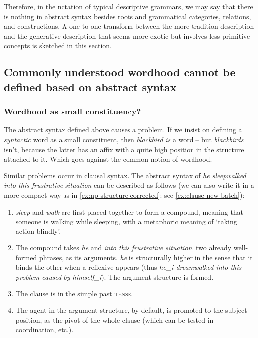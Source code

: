 \documentclass[a4paper, oneside, scheme=plain, 12pt]{article}
\newcommand{\form}[1]{\emph{#1}}
\newcommand{\translate}[1]{`#1'}
\newcommand*{\category}[1]{\textsc{#1}}
\begin{document}
Therefore, in the notation of typical descriptive grammars,
we may say that there is nothing in abstract syntax besides roots
and grammatical categories, relations, and constructions.
A one-to-one transform between the more tradition description
and the generative description that seems more exotic but involves less primitive concepts
is sketched in this section.

\subsection{Commonly understood wordhood cannot be defined based on abstract syntax}\label{sec:no-word-in-syntax}



\subsubsection{Wordhood as small constituency?}\label{sec:derivation-deep-tree}

The abstract syntax defined above causes a problem.
If we insist on defining a \emph{syntactic} word as a small constituent,
then \form{blackbird} \emph{is} a word -- but \form{blackbirds} isn't,
because the latter has an affix with a quite high position in the structure attached to it.
Which goes against the common notion of wordhood.

Similar problems occur in clausal syntax.
The abstract syntax of \form{he sleepwalked into this frustrative situation}
can be described as follows
(we can also write it in a more compact way as in \ref{ex:np-structure-corrected}:
see \ref{ex:clause-new-batch}):

\begin{enumerate}
    \item \form{sleep} and \form{walk} are first placed together to form a compound,
    meaning that someone is walking while sleeping,
    with a metaphoric meaning of \translate{taking action blindly}.
    \item The compound takes \form{he} and \form{into this frustrative situation},
    two already well-formed phrases, as its arguments.
    \form{he} is structurally higher in the sense that it binds the other when a reflexive appears
    (thus \form{he_i dreamwalked into this problem caused by himself_i}).
    The argument structure is formed.
    \item The clause is in the simple past \category{tense}.
    \item The agent in the argument structure, by default, is promoted to the subject position,
    as the pivot of the whole clause (which can be tested in coordination, etc.).
\end{enumerate}
\end{document}
